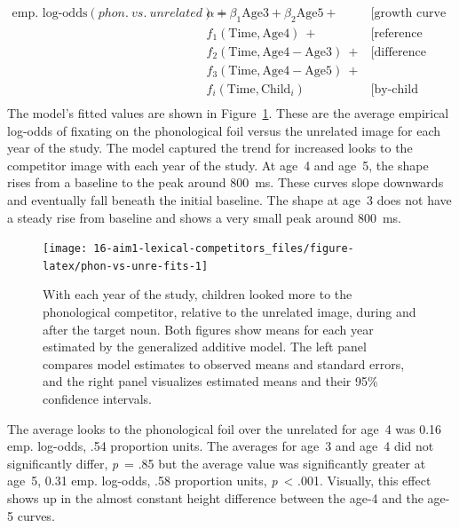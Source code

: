 \documentclass [11pt, proquest] {uwthesis}[2015/03/03]
\begin{document}
\small
\begin{align*}
   \text{emp. log-odds}(\mathit{phon.\ vs.\ unrelated}) =\
   & \alpha + \beta_1\text{Age3} + \beta_2\text{Age5} +\ &\text{[growth curve averages]} \\
   & f_1(\text{Time}, \text{Age4})\ +                    &\text{[reference smooth]} \\
   & f_2(\text{Time}, \text{Age4} - \text{Age3})\ +      &\text{[difference smooths]} \\
   & f_3(\text{Time}, \text{Age4} - \text{Age5})\ +      & \\
   & f_i(\text{Time}, \text{Child}_i)                    &\text{[by-child random smooths]} \\
\end{align*}
The model's fitted values are shown in
Figure~\ref{fig:phon-vs-unre-fits}. These are the average empirical
log-odds of fixating on the phonological foil versus the unrelated image
for each year of the study. The model captured the trend for increased
looks to the competitor image with each year of the study. At age~4 and
age~5, the shape rises from a baseline to the peak around 800~ms. These
curves slope downwards and eventually fall beneath the initial baseline.
The shape at age~3 does not have a steady rise from baseline and shows a
very small peak around 800~ms.







\begin{figure}
\texttt{[image: 16-aim1-lexical-competitors\_files/figure-latex/phon-vs-unre-fits-1]} \caption{With each year of the study, children looked
more to the phonological competitor, relative to the unrelated image,
during and after the target noun. Both figures show means for each year
estimated by the generalized additive model. The left panel compares
model estimates to observed means and standard errors, and the right
panel visualizes estimated means and their 95\% confidence intervals.}\label{fig:phon-vs-unre-fits}
\end{figure}
The average looks to the phonological foil over the unrelated for age~4
was 0.16 emp. log-odds, .54 proportion units. The averages for age~3 and
age~4 did not significantly differ, \emph{p}~= .85 but the average value
was significantly greater at age~5, 0.31 emp. log-odds, .58 proportion
units, \emph{p}~\textless{} .001. Visually, this effect shows up in the
almost constant height difference between the age-4 and the age-5
curves.
\end{document}
